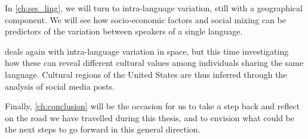 \documentclass[../thesis.tex]{subfiles}
\begin{document}
In \cref{ch:ses_ling}, we will turn to intra-language variation, still with a
geographical component. We will see how socio-economic factors and social mixing can be
predictors of the variation between speakers of a single language. 

 deals again with intra-language variation in space, but this time
investigating how these can reveal different cultural values among individuals sharing
the same language. Cultural regions of the United States are thus inferred through the
analysis of social media posts.

Finally, \cref{ch:conclusion} will be the occasion for us to take a step back and reflect on the road
we have travelled during this thesis, and to envision what could be the next steps to go
forward in this general direction. 
\end{document}
